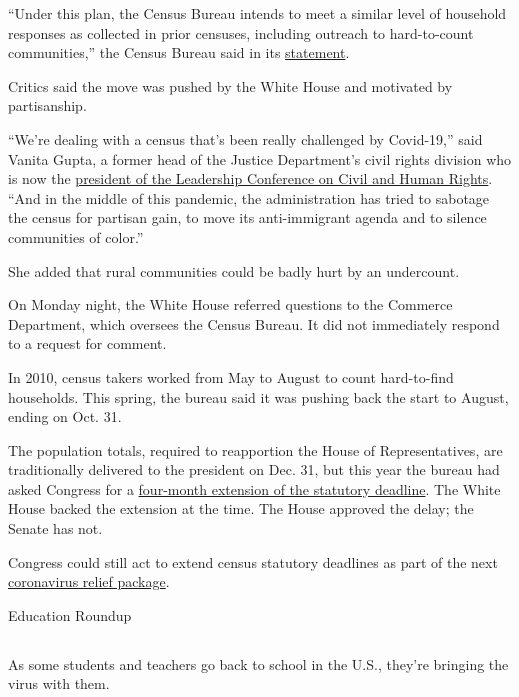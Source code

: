 ``Under this plan, the Census Bureau intends to meet a similar level of
household responses as collected in prior censuses, including outreach
to hard-to-count communities,'' the Census Bureau said in its
\href{https://www.census.gov/newsroom/press-releases/2020/delivering-complete-accurate-count.html}{statement}.

Critics said the move was pushed by the White House and motivated by
partisanship.

``We're dealing with a census that's been really challenged by
Covid-19,'' said Vanita Gupta, a former head of the Justice Department's
civil rights division who is now the
\href{https://civilrights.org/about/our-staff/vanita-gupta/}{president
of the Leadership Conference on Civil and Human Rights}. ``And in the
middle of this pandemic, the administration has tried to sabotage the
census for partisan gain, to move its anti-immigrant agenda and to
silence communities of color.''

She added that rural communities could be badly hurt by an undercount.

On Monday night, the White House referred questions to the Commerce
Department, which oversees the Census Bureau. It did not immediately
respond to a request for comment.

In 2010, census takers worked from May to August to count hard-to-find
households. This spring, the bureau said it was pushing back the start
to August, ending on Oct. 31.

The population totals, required to reapportion the House of
Representatives, are traditionally delivered to the president on Dec.
31, but this year the bureau had asked Congress for a
\href{https://www.nytimes.com/2020/04/13/us/census-coronavirus-delay.html?searchResultPosition=9}{four-month
extension of the statutory deadline}. The White House backed the
extension at the time. The House approved the delay; the Senate has not.

Congress could still act to extend census statutory deadlines as part of
the next
\href{https://www.nytimes.com/2020/08/02/us/politics/coronavirus-jobless-aid.html}{coronavirus
relief package}.

Education Roundup

\hypertarget{-3}{%
\subsection{}\label{-3}}

As some students and teachers go back to school in the U.S., they're
bringing the virus with them.

